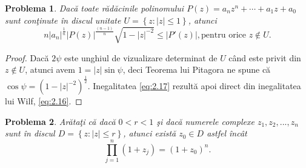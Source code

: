 \documentclass[a4paper,12pt,oneside]{report}
\newtheorem{problem}{Problema}
\begin{document}
\begin{problem}
Dac\u{a} toate r\u{a}d\u{a}cinile polinomului \(P\left ( z \right ) = a_{n}z^{n} +\cdots +a_{1}z + a_{0}\) sunt con\c{t}inute \^{i}n discul unitate \(U= \left \{ z: \left | z \right |\leq 1 \right \}\), atunci
\begin{displaymath}
    n\left | a_{n} \right |^{\frac{1}{n}}\left | P\left ( z \right ) \right |^{\frac{\left ( n-1 \right )}{n}}\sqrt{1 - \left | z \right |^{-2}}\leq \left | {P}'\left ( z \right ) \right |, \text{pentru orice } z\notin U. \label{eq:2.17} \tag{2.17}
\end{displaymath}
\end{problem}
\begin{proof}
Dac\u{a} \(2\psi\) este unghiul de vizualizare determinat de \(U\) c\^{a}nd este privit din \(z \notin U\), atunci avem \(1 = \left | z \right |\sin\psi\), deci Teorema lui Pitagora ne spune c\u{a} \(\cos\psi = \left ( 1 - \left | z \right |^{-2} \right )^{\frac{1}{2}}\). Inegalitatea  \ref{eq:2.17} rezult\u{a} apoi direct din inegalitatea lui Wilf, \ref{eq:2.16}.
\end{proof}
\begin{problem}
Ar\u{a}ta\c{t}i c\u{a} dac\u{a} \(0 < r < 1\) \c{s}i dac\u{a} numerele complexe \(z_{1}, z_{2},...,z_{n}\) sunt \^{i}n discul \(D = \left \{ z: \left | z \right | \leq r\right \}\), atunci exist\u{a} \(z_{0} \in D\) astfel \^{i}nc\^{a}t
\begin{displaymath}
    \prod_{j = 1}^{n}\left ( 1 + z_{j} \right ) = \left ( 1 + z_{0} \right )^{n}.\label{eq:2.18} \tag{2.18}
\end{displaymath}
\end{problem}
\end{document}
